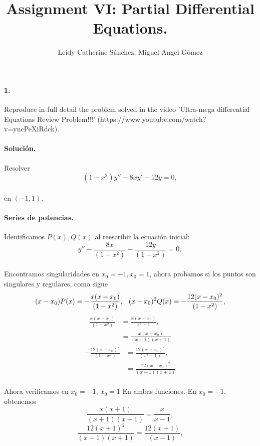 \documentclass{article}
\title{Assignment VI: Partial Differential Equations.}
\author{Leidy Catherine Sánchez, Miguel Angel Gómez}
\begin{document}
	\maketitle
\paragraph{1.}Reproduce in full detail the problem solved in the video 'Ultra-mega differential Equations Review Problem!!!' (https://www.youtube.com/watch?v=yncPeXiRdck).
\paragraph{Solución.} Resolver
\begin{equation}
(1-x^2)y'' - 8xy' - 12y = 0,\label{eq:1_initial}
\end{equation}
\paragraph{} en $(-1,1)$.

\paragraph{Series de potencias.} Identificamos $P(x), Q(x)$ al reescribir la ecuación inicial:
\begin{equation}
y'' - \frac{8x}{(1-x^2)} - \frac{12y}{(1-x^2)} = 0\label{eq:std_form},
\end{equation}
\paragraph{}Encontramos singularidades en $x_0 =-1, x_0 = 1$, ahora probamos si los puntos son singulares y regulares, como sigue
$$
(x-x_0) P(x) = -\frac{x(x-x_0)}{(1-x^2)},\hspace{0.1in} (x - x_0)^2 Q(x) = -\frac{12(x-x_0)^2}{(1-x^2)},
$$
\begin{align*}
\frac{x(x - x_0)}{(1 - x^2)} &= \frac{x (x - x_0)}{x^2 - 1},\\
&= \frac{x(x- x_0)}{(x-1)(x+1)}
\end{align*}
\begin{align*}
-\frac{12(x-x_0)^2}{(1-x^2)} &= \frac{12(x-x_0)^2}{(x^2- 1)},\\
&= \frac{12(x-x_0)^2}{(x-1)(x+1)}
\end{align*}
\paragraph{}Ahora verificamos en $x_0 = -1$, $x_0 = 1$ En ambas funciones. En $x_0 = -1$, obtenemos
$$\frac{x(x + 1)}{(x + 1)(x - 1)} = \frac{x}{x-1},$$
$$\frac{12(x+1)^2}{(x-1)(x+1)} = \frac{12(x+1)}{(x-1)},$$
\end{document}
